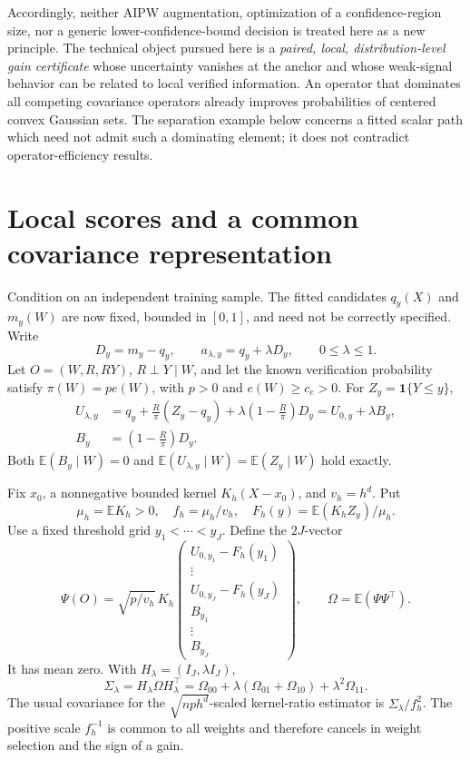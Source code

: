 \documentclass[11pt]{article}
\theoremstyle{remark}\newtheorem{remark}[theorem]{Remark}
\newcommand{\E}{\mathbb E}
\newcommand{\ind}{\mathbf 1}
\begin{document}
Accordingly, neither AIPW augmentation, optimization of a confidence-region size, nor a generic lower-confidence-bound decision is treated here as a new principle.
The technical object pursued here is a \emph{paired, local, distribution-level gain certificate} whose uncertainty vanishes at the anchor and whose weak-signal behavior can be related to local verified information.
An operator that dominates all competing covariance operators already improves probabilities of centered convex Gaussian sets. The separation example below concerns a fitted scalar path which need not admit such a dominating element; it does not contradict operator-efficiency results.

\section{Local scores and a common covariance representation}
Condition on an independent training sample. The fitted candidates $q_y(X)$ and $m_y(W)$ are now fixed, bounded in $[0,1]$, and need not be correctly specified. Write
\[
 D_y=m_y-q_y,\qquad a_{\lambda,y}=q_y+\lambda D_y,\qquad 0\leq\lambda\leq1.
\]
Let $O=(W,R,RY)$, $R\perp Y\mid W$, and let the known verification probability satisfy
$\pi(W)=p e(W)$, with $p>0$ and $e(W)\geq c_e>0$.
For $Z_y=\ind\{Y\leq y\}$,
\begin{align}
 U_{\lambda,y}
 &=q_y+\frac R\pi(Z_y-q_y)
   +\lambda\left(1-\frac R\pi\right)D_y
 =U_{0,y}+\lambda B_y,\label{eq:affine}\\
 B_y&=\left(1-\frac R\pi\right)D_y.
\end{align}
Both $\E(B_y\mid W)=0$ and $\E(U_{\lambda,y}\mid W)=\E(Z_y\mid W)$ hold exactly.

Fix $x_0$, a nonnegative bounded kernel $K_h(X-x_0)$, and $v_h=h^d$. Put
\[
 \mu_h=\E K_h>0,\quad f_h=\mu_h/v_h,\quad
 F_h(y)=\E(K_h Z_y)/\mu_h.
\]
Use a fixed threshold grid $y_1<\cdots<y_J$. Define the $2J$-vector
\begin{equation}
 \Psi(O)=\sqrt{p/v_h}\,K_h
 \begin{pmatrix}U_{0,y_1}-F_h(y_1)\\ \vdots\\U_{0,y_J}-F_h(y_J)\\B_{y_1}\\\vdots\\B_{y_J}\end{pmatrix},
 \qquad \Omega=\E(\Psi\Psi^\top).
 \label{eq:omega}
\end{equation}
It has mean zero. With $H_\lambda=(I_J,\lambda I_J)$,
\begin{equation}
 \Sigma_\lambda=H_\lambda\Omega H_\lambda^\top
 =\Omega_{00}+\lambda(\Omega_{01}+\Omega_{10})+\lambda^2\Omega_{11}.
 \label{eq:pathcov}
\end{equation}
The usual covariance for the $\sqrt{n p h^d}$-scaled kernel-ratio estimator is $\Sigma_\lambda/f_h^2$. The positive scale $f_h^{-1}$ is common to all weights and therefore cancels in weight selection and the sign of a gain.
\end{document}
